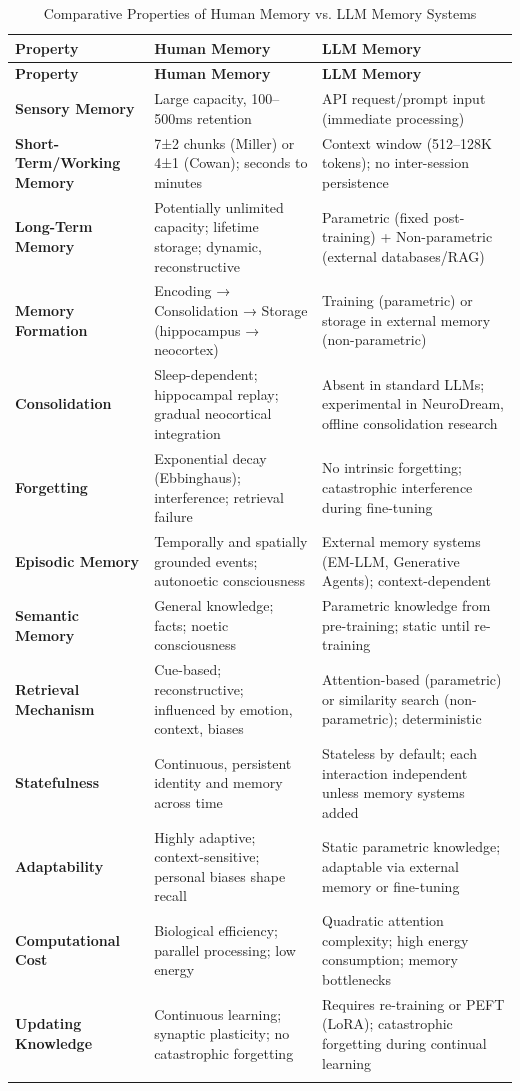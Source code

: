 \documentclass[11pt,letterpaper]{article}
\begin{document}
\begin{longtable}{p{} p{} p{}}
\toprule
\textbf{Property} & \textbf{Human Memory} & \textbf{LLM Memory} \\
\midrule
\endfirsthead
\toprule
\textbf{Property} & \textbf{Human Memory} & \textbf{LLM Memory} \\
\midrule
\endhead
\textbf{Sensory Memory} &
Large capacity, 100--500ms retention &
API request/prompt input (immediate processing) \\
\midrule
\textbf{Short-Term/Working Memory} &
7±2 chunks (Miller) or 4±1 (Cowan); seconds to minutes &
Context window (512--128K tokens); no inter-session persistence \\
\midrule
\textbf{Long-Term Memory} &
Potentially unlimited capacity; lifetime storage; dynamic, reconstructive &
Parametric (fixed post-training) + Non-parametric (external databases/RAG) \\
\midrule
\textbf{Memory Formation} &
Encoding → Consolidation → Storage (hippocampus → neocortex) &
Training (parametric) or storage in external memory (non-parametric) \\
\midrule
\textbf{Consolidation} &
Sleep-dependent; hippocampal replay; gradual neocortical integration &
Absent in standard LLMs; experimental in NeuroDream, offline consolidation research \\
\midrule
\textbf{Forgetting} &
Exponential decay (Ebbinghaus); interference; retrieval failure &
No intrinsic forgetting; catastrophic interference during fine-tuning \\
\midrule
\textbf{Episodic Memory} &
Temporally and spatially grounded events; autonoetic consciousness &
External memory systems (EM-LLM, Generative Agents); context-dependent \\
\midrule
\textbf{Semantic Memory} &
General knowledge; facts; noetic consciousness &
Parametric knowledge from pre-training; static until re-training \\
\midrule
\textbf{Retrieval Mechanism} &
Cue-based; reconstructive; influenced by emotion, context, biases &
Attention-based (parametric) or similarity search (non-parametric); deterministic \\
\midrule
\textbf{Statefulness} &
Continuous, persistent identity and memory across time &
Stateless by default; each interaction independent unless memory systems added \\
\midrule
\textbf{Adaptability} &
Highly adaptive; context-sensitive; personal biases shape recall &
Static parametric knowledge; adaptable via external memory or fine-tuning \\
\midrule
\textbf{Computational Cost} &
Biological efficiency; parallel processing; low energy &
Quadratic attention complexity; high energy consumption; memory bottlenecks \\
\midrule
\textbf{Updating Knowledge} &
Continuous learning; synaptic plasticity; no catastrophic forgetting &
Requires re-training or PEFT (LoRA); catastrophic forgetting during continual learning \\
\bottomrule
\caption{Comparative Properties of Human Memory vs. LLM Memory Systems}
\end{longtable}
\end{document}
